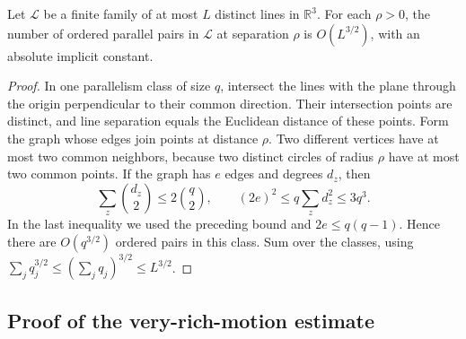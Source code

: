 \begin{lemma}
\label{lem:mot-parallel-pairs}
Let $\mathcal{L}$ be a finite family of at most $L$ distinct lines in $\mathbb{R}^3$.  For each $\rho>0$, the number of ordered parallel pairs in $\mathcal{L}$ at separation $\rho$ is $O(L^{3/2})$, with an absolute implicit constant.
\end{lemma}

\begin{proof}
In one parallelism class of size $q$, intersect the lines with the plane through the origin perpendicular to their common direction.  Their intersection points are distinct, and line separation equals the Euclidean distance of these points. Form the graph whose edges join points at distance $\rho$. Two different vertices have at most two common neighbors, because two distinct circles of radius $\rho$ have at most two common points.  If the graph has $e$ edges and degrees $d_z$, then
\[
 \sum_z\binom{d_z}{2}\le2\binom q2,
 \qquad
 (2e)^2\le q\sum_zd_z^2\le3q^3.
\]
In the last inequality we used the preceding bound and $2e\le q(q-1)$.  Hence there are $O(q^{3/2})$ ordered pairs in this class.  Sum over the classes, using $\sum_jq_j^{3/2}\le(\sum_jq_j)^{3/2}\le L^{3/2}$.
\end{proof}

\subsection{Proof of the very-rich-motion estimate}

